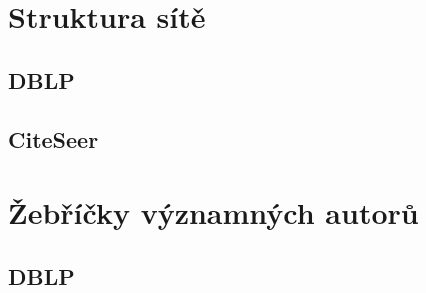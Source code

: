\documentclass[12pt,titlepage]{report}
\begin{document}
\section{Struktura sítě}
\subsection{DBLP}
\subsection{CiteSeer}

\section{Žebříčky významných autorů}
\subsection{DBLP}
\end{document}
